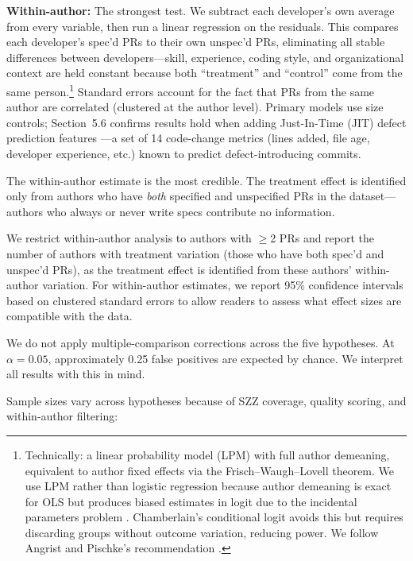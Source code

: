 \documentclass[a4paper,UKenglish,cleveref,autoref,thm-restate]{lipics-v2021}
\begin{document}
\noindent
\textbf{Within-author:} The strongest test. We subtract each developer's own average from every variable, then run a linear regression on the residuals. This compares each developer's spec'd PRs to their own unspec'd PRs, eliminating all stable differences between developers---skill, experience, coding style, and organizational context are held constant because both ``treatment'' and ``control'' come from the same person.\footnote{Technically: a linear probability model (LPM) with full author demeaning, equivalent to author fixed effects via the Frisch--Waugh--Lovell theorem. We use LPM rather than logistic regression because author demeaning is exact for OLS but produces biased estimates in logit due to the incidental parameters problem \cite{neyman1948}. Chamberlain's conditional logit avoids this but requires discarding groups without outcome variation, reducing power. We follow Angrist and Pischke's recommendation \cite{angrist2009}.} Standard errors account for the fact that PRs from the same author are correlated (clustered at the author level). Primary models use size controls; Section~5.6 confirms results hold when adding Just-In-Time (JIT) defect prediction features \cite{kamei2013}---a set of 14 code-change metrics (lines added, file age, developer experience, etc.) known to predict defect-introducing commits.

The within-author estimate is the most credible. The treatment effect is identified only from authors who have \emph{both} specified and unspecified PRs in the dataset---authors who always or never write specs contribute no information.

We restrict within-author analysis to authors with $\geq$2 PRs and report the number of authors with treatment variation (those who have both spec'd and unspec'd PRs), as the treatment effect is identified from these authors' within-author variation. For within-author estimates, we report 95\% confidence intervals based on clustered standard errors to allow readers to assess what effect sizes are compatible with the data.

We do not apply multiple-comparison corrections across the five hypotheses. At $\alpha = 0.05$, approximately 0.25 false positives are expected by chance. We interpret all results with this in mind.

Sample sizes vary across hypotheses because of SZZ coverage, quality scoring, and within-author filtering:
\end{document}
